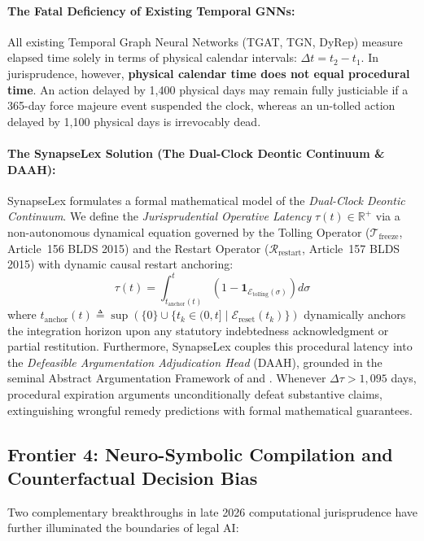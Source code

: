 \documentclass[11pt,a4paper]{article}
\begin{document}
\paragraph{The Fatal Deficiency of Existing Temporal GNNs:} All existing Temporal Graph Neural Networks (TGAT, TGN, DyRep) measure elapsed time solely in terms of physical calendar intervals: $\Delta t = t_2 - t_1$. In jurisprudence, however, \textbf{physical calendar time does not equal procedural time}. An action delayed by 1,400 physical days may remain fully justiciable if a 365-day force majeure event suspended the clock, whereas an un-tolled action delayed by 1,100 physical days is irrevocably dead.

\paragraph{The SynapseLex Solution (The Dual-Clock Deontic Continuum \& DAAH):} SynapseLex formulates a formal mathematical model of the \textit{Dual-Clock Deontic Continuum}. We define the \textit{Jurisprudential Operative Latency} $\tau(t) \in \mathbb{R}^+$ via a non-autonomous dynamical equation governed by the Tolling Operator ($\mathcal{T}_{\text{freeze}}$, Article~156 BLDS 2015) and the Restart Operator ($\mathcal{R}_{\text{restart}}$, Article~157 BLDS 2015) with dynamic causal restart anchoring:
\begin{equation}
\label{eq:dual_clock_continuum}
\tau(t) = \int_{t_{\text{anchor}}(t)}^t \left(1 - \mathbf{1}_{\mathcal{E}_{\text{tolling}}(\sigma)}\right) d\sigma
\end{equation}
where $t_{\text{anchor}}(t) \triangleq \sup\left(\{0\} \cup \{t_k \in (0, t] \mid \mathcal{E}_{\text{reset}}(t_k)\}\right)$ dynamically anchors the integration horizon upon any statutory indebtedness acknowledgment or partial restitution. Furthermore, SynapseLex couples this procedural latency into the \textit{Defeasible Argumentation Adjudication Head} (DAAH), grounded in the seminal Abstract Argumentation Framework of \citet{dung1995acceptability} and \citet{prakken2015formal}. Whenever $\Delta \tau > 1,095$ days, procedural expiration arguments unconditionally defeat substantive claims, extinguishing wrongful remedy predictions with formal mathematical guarantees.

\subsection{Frontier 4: Neuro-Symbolic Compilation and Counterfactual Decision Bias}
Two complementary breakthroughs in late 2026 computational jurisprudence have further illuminated the boundaries of legal AI:
\end{document}
